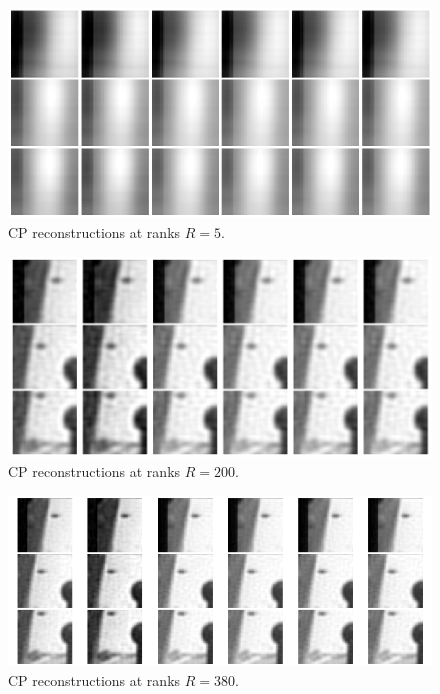\documentclass[11pt]{article}
\begin{document}
\begin{figure}[H]
  \centering
  \includegraphics[width=\linewidth]{CP rank 5.png}
  \caption{CP reconstructions at ranks $R = 5$.}
  \label{fig:cp-rank-visuals}
\end{figure}

\begin{figure}[H]
  \centering
  \includegraphics[width=\linewidth]{CP rank 200.png}
  \caption{CP reconstructions at ranks $R = 200$.}
  \label{fig:cp-rank-visuals}
\end{figure}

\begin{figure}[H]
  \centering
  \includegraphics[width=\linewidth]{CP rank 380.png}
  \caption{CP reconstructions at ranks $R = 380$.}
  \label{fig:cp-rank-visuals}
\end{figure}
\end{document}
